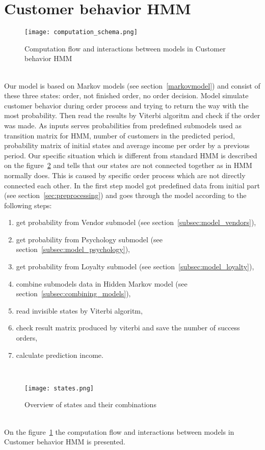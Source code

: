 \section{Customer behavior HMM} \label{sec:submodels}
\begin{figure}[h!]
    \begin{center}
        \texttt{[image: computation\_schema.png]}
    \end{center}
    \caption{Computation flow and interactions between models in Customer behavior HMM}
    \label{Model schema with interaction}
\end{figure}\\
Our model is based on Markov models (see section~\ref{markovmodel}) and consist of these three states: order, not finished order, no order decision.
Model simulate customer behavior during order process and trying to return the way with the most probability.
Then read the results by Viterbi algoritm and check if the order was made.
As inputs serves probabilities from predefined submodels used as transition matrix for HMM, number of customers in the predicted period,
probability matrix of initial states and average income per order by a previous period.
Our specific situation which is different from standard HMM is described on the figure~\ref{states} and tells that our states are not connected together as in HMM normally does.
This is caused by specific order process which are not directly connected each other.
In the first step model got predefined data from initial part (see section~\ref{sec:preprocessing}) and goes through the model according to the following steps:
\begin{enumerate}
    \item get probability from Vendor submodel (see section~\ref{subsec:model_vendors}),
    \item get probability from Psychology submodel (see section~\ref{subsec:model_psychology}),
    \item get probability from Loyalty submodel (see section~\ref{subsec:model_loyalty}),
    \item combine submodels data in Hidden Markov model (see section~\ref{subsec:combining_models}),
    \item read invisible states by Viterbi algoritm,
    \item check result matrix produced by viterbi and save the number of success orders,
    \item calculate prediction income.
\end{enumerate}\\
\begin{figure}[h!]
    \begin{center}
        \texttt{[image: states.png]}
    \end{center}
    \caption{Overview of states and their combinations}
    \label{states}
\end{figure}\\
On the figure~\ref{Model schema with interaction} the computation flow and interactions between models in Customer behavior HMM is presented.\\
